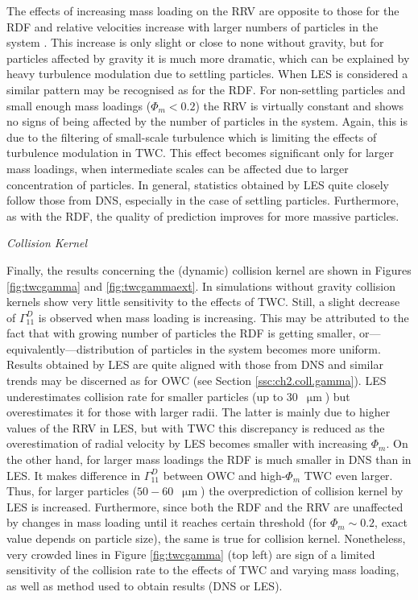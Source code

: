 \documentclass{pracamgren}
\begin{document}
The effects of increasing mass loading on the RRV are opposite to those for the RDF and relative velocities increase with larger numbers of particles in the system \parencite[Fig. 23 and 24 therein]{Rosa2020}.
This increase is only slight or close to none without gravity, but for particles affected by gravity it is much more dramatic, which can be explained by heavy turbulence modulation due to settling particles.
When LES is considered a similar pattern may be recognised as for the RDF.
For non-settling particles and small enough mass loadings (${\Phi_m < 0.2}$) the RRV is virtually constant and shows no signs of being affected by the number of particles in the system.
Again, this is due to the filtering of small-scale turbulence which is limiting the effects of turbulence modulation in TWC.
This effect becomes significant only for larger mass loadings, when intermediate scales can be affected due to larger concentration of particles.
In general, statistics obtained by LES quite closely follow those from DNS, especially in the case of settling particles.
Furthermore, as with the RDF, the quality of prediction improves for more massive particles.  
 
\medskip

\emph{Collision Kernel}

Finally, the results concerning the (dynamic) collision kernel are shown in Figures \ref{fig:twcgamma} and \ref{fig:twcgammaext}.
In simulations without gravity collision kernels show very little sensitivity to the effects of TWC.
Still, a slight decrease of $\Gamma^D_{11}$ is observed when mass loading is increasing.
This may be attributed to the fact that with growing number of particles the RDF is getting smaller, or---equivalently---distribution of particles in the system becomes more uniform.
Results obtained by LES are quite aligned with those from DNS and similar trends may be discerned as for OWC (see Section \ref{ssc:ch2.coll.gamma}).
LES underestimates collision rate for smaller particles (up to $30$~$\upmu\text{m}$) but overestimates it for those with larger radii.
The latter is mainly due to higher values of the RRV in LES, but with TWC this discrepancy is reduced as the overestimation of radial velocity by LES becomes smaller with increasing $\Phi_m$.
On the other hand, for larger mass loadings the RDF is much smaller in DNS than in LES.
It makes difference in $\Gamma^D_{11}$ between OWC and high-$\Phi_m$ TWC even larger.
Thus, for larger particles ($50-60$~$\upmu\text{m}$) the overprediction of collision kernel by LES is increased.
Furthermore, since both the RDF and the RRV are unaffected by changes in mass loading until it reaches certain threshold (for $\Phi_m \sim 0.2$, exact value depends on particle size), the same is true for collision kernel.
Nonetheless, very crowded lines in Figure \ref{fig:twcgamma} (top left) are sign of a limited sensitivity of the collision rate to the effects of TWC and varying mass loading, as well as method used to obtain results (DNS or LES).
 
\end{document}
